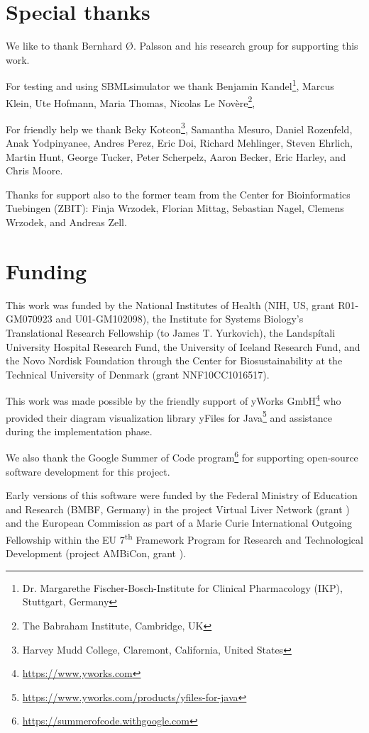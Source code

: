 \section{Special thanks}

We like to thank Bernhard \O. Palsson and his research group for supporting this work.

For testing and using SBMLsimulator we thank
Benjamin Kandel\footnote{Dr. Margarethe Fischer-Bosch-Institute for Clinical Pharmacology (IKP), Stuttgart, Germany\label{fn:ikp}},
Marcus Klein,
Ute Hofmann,
Maria Thomas,
Nicolas Le Nov\`{e}re\footnote{The Babraham Institute, Cambridge, UK\label{fn:babraham}},

For friendly help we thank Beky Kotcon\footnote{Harvey Mudd College, Claremont, California, United States\label{fn:harvey}}, Samantha Mesuro, Daniel Rozenfeld, Anak Yodpinyanee, Andres Perez, Eric Doi, Richard Mehlinger, Steven Ehrlich, Martin Hunt, George Tucker, Peter Scherpelz, Aaron Becker, Eric Harley, and Chris Moore.

Thanks for support also to the former team from the Center for Bioinformatics Tuebingen (ZBIT): Finja Wrzodek, Florian Mittag, Sebastian Nagel, Clemens Wrzodek, and Andreas Zell.

\section{Funding}

This work was funded by the National Institutes of Health (NIH, US, grant \numero R01-GM070923 and U01-GM102098), the Institute for Systems Biology's Translational Research Fellowship (to James T. Yurkovich), the Landsp\'itali University Hospital Research Fund, the University of Iceland Research Fund, and the Novo Nordisk Foundation through the Center for Biosustainability at the Technical University of Denmark (grant \numero NNF10CC1016517).

This work was made possible by the friendly support of yWorks GmbH\footnote{\url{https://www.yworks.com}} who provided their diagram visualization library yFiles for Java\texttrademark\footnote{\url{https://www.yworks.com/products/yfiles-for-java}} and assistance during the implementation phase.

We also thank the Google Summer of Code program\footnote{\url{https://summerofcode.withgoogle.com}} for supporting open-source software development for this project.

Early versions of this software were funded by the Federal Ministry of Education and Research (BMBF, Germany) in the project Virtual Liver Network (grant ) and the European Commission as part of a Marie Curie International Outgoing Fellowship within the EU 7\textsuperscript{th} Framework Program for Research and Technological Development (project AMBiCon, grant ).
